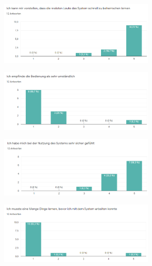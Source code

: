 \noChanges

\begin{figure}[H]
    \centering
    \includegraphics[width=0.7\textwidth]{media/survey/fastLearning.png}
\end{figure}

\noChanges
\begin{figure}[H]
    \centering
    \includegraphics[width=0.7\textwidth]{media/survey/overelaboratedInterface.png}
\end{figure}

\noChanges
\begin{figure}[H]
    \centering
    \includegraphics[width=0.7\textwidth]{media/survey/safeUsage.png}
\end{figure}

\noChanges
\begin{figure}[H]
    \centering
    \includegraphics[width=0.7\textwidth]{media/survey/needToLearnUsage.png}
\end{figure}

